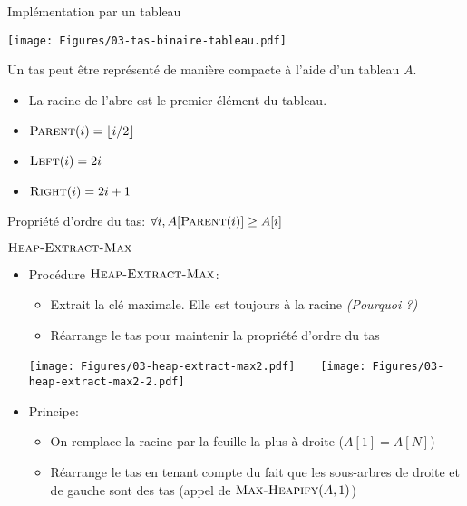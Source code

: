 \begin{frame}{Implémentation par un tableau}

\centerline{\texttt{[image: Figures/03-tas-binaire-tableau.pdf]}}

\bigskip

Un tas peut être représenté de manière compacte à l'aide d'un tableau $A$.

\begin{itemize}
\item La racine de l'abre est le premier élément du tableau.
\item $\textnormal{\scshape Parent}(i)=\lfloor i/2\rfloor$
\item $\textnormal{\scshape Left}(i)=2i$
\item $\textnormal{\scshape Right}(i)=2i+1$
\end{itemize}

Propriété d'ordre du tas: $\forall i, A[\textnormal{\scshape Parent}(i)]\geq A[i]$

\end{frame}

\begin{frame}{$\textnormal{\scshape Heap-Extract-Max}$}

\begin{itemize}
\item Procédure $\textnormal{\scshape Heap-Extract-Max}$:
\begin{itemize}
\item Extrait la clé maximale. Elle est toujours à la racine \emph{(Pourquoi ?)}
\item Réarrange le tas pour maintenir la propriété d'ordre du tas
\end{itemize}

\centerline{\texttt{[image: Figures/03-heap-extract-max2.pdf]}~~~~\texttt{[image: Figures/03-heap-extract-max2-2.pdf]}}

\item Principe:
\begin{itemize}
\item On remplace la racine par la feuille la plus à droite ($A[1]=A[N]$)
\item Réarrange le tas en tenant compte du fait que les sous-arbres de droite et de gauche sont des tas (appel de $\textnormal{\scshape Max-Heapify}(A,1)$)
\end{itemize}
\end{itemize}
\end{frame}

